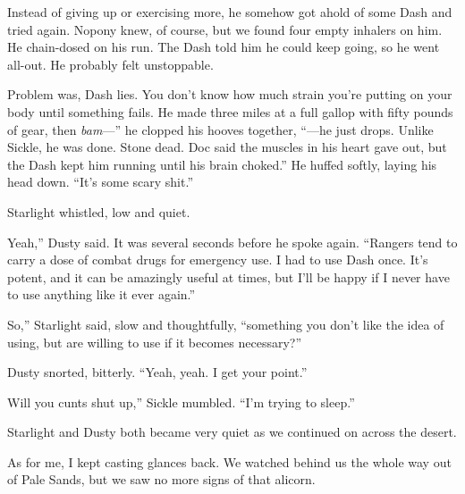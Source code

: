 \leavevmode{}Instead of giving up or exercising more, he somehow got ahold of some Dash and tried again. Nopony knew, of course, but we found four empty inhalers on him. He chain-dosed on his run. The Dash told him he could keep going, so he went all-out. He probably felt unstoppable.

\leavevmode{}Problem was, Dash lies. You don’t know how much strain you’re putting on your body until something fails. He made three miles at a full gallop with fifty pounds of gear, then \textit{bam}—” he clopped his hooves together, “—he just drops. Unlike Sickle, he was done. Stone dead. Doc said the muscles in his heart gave out, but the Dash kept him running until his brain choked.” He huffed softly, laying his head down. “It’s some scary shit.”

Starlight whistled, low and quiet.

\leavevmode{}Yeah,” Dusty said. It was several seconds before he spoke again. “Rangers tend to carry a dose of combat drugs for emergency use. I had to use Dash once. It’s potent, and it can be amazingly useful at times, but I’ll be happy if I never have to use anything like it ever again.”

\leavevmode{}So,” Starlight said, slow and thoughtfully, “something you don’t like the idea of using, but are willing to use if it becomes necessary?”

Dusty snorted, bitterly. “Yeah, yeah. I get your point.”

\leavevmode{}Will you cunts shut up,” Sickle mumbled. “I’m trying to sleep.”

Starlight and Dusty both became very quiet as we continued on across the desert.

As for me, I kept casting glances back. We watched behind us the whole way out of Pale Sands, but we saw no more signs of that alicorn.